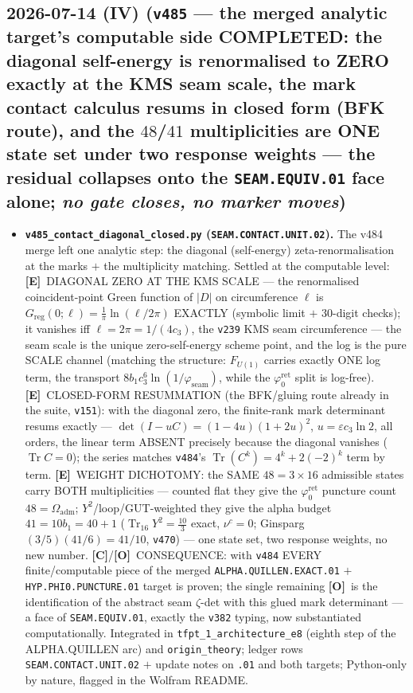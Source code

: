 \documentclass[11pt]{article}
\providecommand{\mE}{\textbf{[E]}}\providecommand{\mC}{\textbf{[C]}}
\providecommand{\mO}{\textbf{[O]}}\providecommand{\mX}{\textbf{[X]}}
\providecommand{\cthree}{c_3}\providecommand{\phiz}{\varphi_0^{\mathrm{ret}}}
\providecommand{\Oadm}{\Omega_{\mathrm{adm}}}\providecommand{\ainv}{\alpha^{-1}}
\begin{document}
\subsection*{2026-07-14 (IV) (\texttt{v485} --- the merged analytic target's computable side COMPLETED: the diagonal self-energy is renormalised to ZERO exactly at the KMS seam scale, the mark contact calculus resums in closed form (BFK route), and the $48$/$41$ multiplicities are ONE state set under two response weights --- the residual collapses onto the \texttt{SEAM.EQUIV.01} face alone; \emph{no gate closes, no marker moves})}
\begin{itemize}[leftmargin=1.5em]
\item \textbf{\texttt{v485\_contact\_diagonal\_closed.py} (\texttt{SEAM.CONTACT.UNIT.02}).} The v484
merge left one analytic step: the diagonal (self-energy) zeta-renormalisation at the marks $+$ the
multiplicity matching. Settled at the computable level: \mE\ DIAGONAL ZERO AT THE KMS SCALE --- the
renormalised coincident-point Green function of $|D|$ on circumference $\ell$ is
$G_{\mathrm{reg}}(0;\ell)=\tfrac1\pi\ln(\ell/2\pi)$ EXACTLY (symbolic limit $+$ $30$-digit checks); it
vanishes iff $\ell=2\pi=1/(4\cthree)$, the \texttt{v239} KMS seam circumference --- the seam scale is the
unique zero-self-energy scheme point, and the log is the pure SCALE channel (matching the structure:
$F_{U(1)}$ carries exactly ONE log term, the transport $8b_1\cthree^6\ln(1/\varphi_{\mathrm{seam}})$,
while the $\phiz$ split is log-free). \mE\ CLOSED-FORM RESUMMATION (the BFK/gluing route already in the
suite, \texttt{v151}): with the diagonal zero, the finite-rank mark determinant resums exactly ---
$\det(I-uC)=(1-4u)(1+2u)^2$, $u=\varepsilon\cthree\ln2$, all orders, the linear term ABSENT precisely
because the diagonal vanishes ($\operatorname{Tr}C=0$); the series matches \texttt{v484}'s
$\operatorname{Tr}(C^k)=4^k+2(-2)^k$ term by term. \mE\ WEIGHT DICHOTOMY: the SAME $48=3\times16$
admissible states carry BOTH multiplicities --- counted flat they give the $\phiz$ puncture count
$48=\Oadm$; $Y^2$/loop/GUT-weighted they give the alpha budget $41=10b_1=40+1$
($\operatorname{Tr}_{16}Y^2=\tfrac{10}3$ exact, $\nu^c=0$; Ginsparg $(3/5)(41/6)=41/10$, \texttt{v470})
--- one state set, two response weights, no new number. \mC/\mO\ CONSEQUENCE: with \texttt{v484} EVERY
finite/computable piece of the merged \texttt{ALPHA.QUILLEN.EXACT.01} $+$ \texttt{HYP.PHI0.PUNCTURE.01}
target is proven; the single remaining \mO\ is the identification of the abstract seam $\zeta$-det with
this glued mark determinant --- a face of \texttt{SEAM.EQUIV.01}, exactly the \texttt{v382} typing, now
substantiated computationally. Integrated in \texttt{tfpt\_1\_architecture\_e8} (eighth step of the
ALPHA.QUILLEN arc) and \texttt{origin\_theory}; ledger rows \texttt{SEAM.CONTACT.UNIT.02} $+$ update
notes on \texttt{.01} and both targets; Python-only by nature, flagged in the Wolfram README.
\end{itemize}
\end{document}
